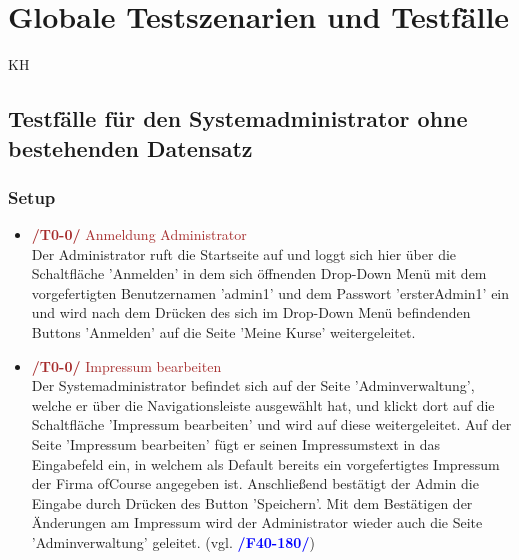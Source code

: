 \documentclass[a4paper]{scrreprt}
\newcounter{Lc}
\newcounter{Hc}
\newcommand{\resetAllCounter}{\setcounter{Lc}{0}\setcounter{Hc}{1}}
\begin{document}
\resetAllCounter
\newcommand{\Test}[1]{\stepcounter{Lc}\textcolor{Brown}{\textbf{/T\arabic{Hc}0-\arabic{Lc}0/} #1} \\}
\newcommand{\RefFuncBlue}[1]{\textcolor{Blue}{\textbf{#1}}}
\newcommand{\RefFuncGreen}[1]{\textcolor{Green}{\textbf{#1}}}
\newcommand{\RefFuncBrown}[1]{\textcolor{Brown}{\textbf{#1}}}
\chapter{Globale Testszenarien und Testfälle}
	 \begin{tiny}
	 	KH\\
	 \end{tiny}

	\section{Testfälle für den Systemadministrator ohne bestehenden Datensatz}
		\subsection{Setup}
			\begin{itemize}
				\item \Test{Anmeldung Administrator} 
			     Der Administrator ruft die Startseite auf und loggt sich hier über die Schaltfläche 'Anmelden' in dem sich öffnenden Drop-Down Menü mit dem vorgefertigten Benutzernamen 'admin1' und dem Passwort 'ersterAdmin1' ein und wird nach dem Drücken des sich im Drop-Down Menü befindenden Buttons 'Anmelden' auf die Seite 'Meine Kurse' weitergeleitet. 
				 
				\item \Test{Impressum bearbeiten}
				 Der Systemadministrator befindet sich auf der Seite 'Adminverwaltung', welche er über die Navigationsleiste ausgewählt hat, und klickt dort auf die Schaltfläche 'Impressum bearbeiten' und wird auf diese weitergeleitet. Auf der Seite 'Impressum bearbeiten' fügt er seinen Impressumstext in das Eingabefeld ein, in welchem als Default bereits ein vorgefertigtes Impressum der Firma ofCourse angegeben ist. Anschließend bestätigt der Admin die Eingabe durch Drücken des Button 'Speichern'. Mit dem Bestätigen der Änderungen am Impressum wird der Administrator wieder auch die Seite 'Adminverwaltung' geleitet. (vgl. \RefFuncBlue{/F40-180/})
				 
				
			\end{itemize}		
				
\end{document}
